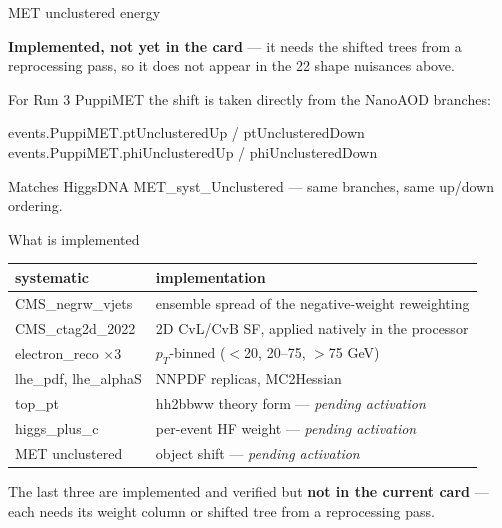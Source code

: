 \documentclass[aspectratio=169,10pt]{beamer}
\newcommand{\code}[1]{{\ttfamily\small\colorbox{codebg}{#1}}}
\begin{document}
\begin{frame}[fragile]{MET unclustered energy}
\begin{warnbox}
\textbf{Implemented, not yet in the card} --- it needs the shifted trees from a
reprocessing pass, so it does not appear in the 22 shape nuisances above.
\end{warnbox}
\vspace{0.3em}
For Run 3 PuppiMET the shift is taken directly from the NanoAOD branches:
\begin{semiverbatim}\small
events.PuppiMET.ptUnclusteredUp / ptUnclusteredDown
events.PuppiMET.phiUnclusteredUp / phiUnclusteredDown
\end{semiverbatim}
\vspace{0.2em}
Matches HiggsDNA \code{MET\_syst\_Unclustered} --- same branches, same up/down
ordering.
\end{frame}

\begin{frame}{What is implemented}
\vspace{0.3em}
\begin{center}
\small
\begin{tabular}{ll}
\toprule
systematic & implementation \\
\midrule
\code{CMS\_negrw\_vjets} & ensemble spread of the negative-weight reweighting \\
\code{CMS\_ctag2d\_2022} & 2D CvL/CvB SF, applied natively in the processor \\
\code{electron\_reco} $\times$3 & $p_T$-binned ($<$20, 20--75, $>$75 GeV) \\
\code{lhe\_pdf}, \code{lhe\_alphaS} & NNPDF replicas, MC2Hessian \\
\code{top\_pt} & hh2bbww theory form --- \emph{pending activation} \\
\code{higgs\_plus\_c} & per-event HF weight --- \emph{pending activation} \\
MET unclustered & object shift --- \emph{pending activation} \\
\bottomrule
\end{tabular}
\end{center}
\vspace{0.3em}
\begin{warnbox}
The last three are implemented and verified but \textbf{not in the current card} ---
each needs its weight column or shifted tree from a reprocessing pass.
\end{warnbox}
\end{frame}
\end{document}
